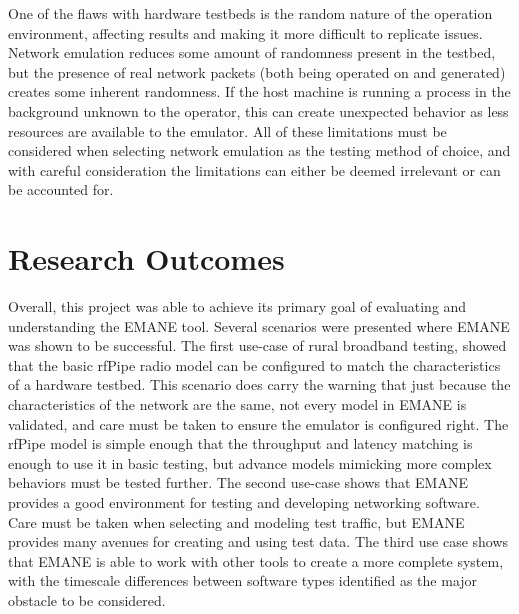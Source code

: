 One of the flaws with hardware testbeds is the random nature of the operation environment, affecting results and making it more difficult to replicate issues.
Network emulation reduces some amount of randomness present in the testbed, but the presence of real network packets (both being operated on and generated) creates some inherent randomness.
If the host machine is running a process in the background unknown to the operator, this can create unexpected behavior as less resources are available to the emulator.
All of these limitations must be considered when selecting network emulation as the testing method of choice, and with careful consideration the limitations can either be deemed irrelevant or can be accounted for.

\section{Research Outcomes}
Overall, this project was able to achieve its primary goal of evaluating and understanding the EMANE tool.
Several scenarios were presented where EMANE was shown to be successful.
The first use-case of rural broadband testing, showed that the basic rfPipe radio model can be configured to match the characteristics of a hardware testbed.
This scenario does carry the warning that just because the characteristics of the network are the same, not every model in EMANE is validated, and care must be taken to ensure the emulator is configured right.
The rfPipe model is simple enough that the throughput and latency matching is enough to use it in basic testing, but advance models mimicking more complex behaviors must be tested further.
The second use-case shows that EMANE provides a good environment for testing and developing networking software.
Care must be taken when selecting and modeling test traffic, but EMANE provides many avenues for creating and using test data.
The third use case shows that EMANE is able to work with other tools to create a more complete system, with the timescale differences between software types identified as the major obstacle to be considered.

